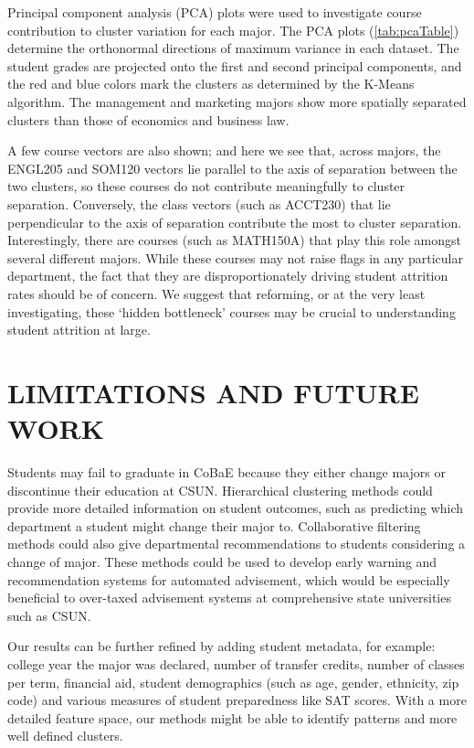 \documentclass{sigchi}
\begin{document}
Principal component analysis (PCA) plots were used to investigate course contribution to cluster variation for each major. The PCA plots (\ref{tab:pcaTable}) determine the orthonormal directions of maximum variance in each dataset. The student grades are projected onto the first and second principal components, and the red and blue colors mark the clusters as determined by the K-Means algorithm. The management and marketing majors show more spatially separated clusters than those of economics and business law. 

A few course vectors are also shown; and here we see that, across majors, the ENGL205 and SOM120 vectors lie parallel  to the axis of separation between the two clusters, so these courses do not contribute meaningfully to cluster separation. Conversely, the class vectors (such as ACCT230) that lie perpendicular to the axis of separation contribute the most to cluster separation. Interestingly, there are courses (such as MATH150A) that play this role amongst several different majors. While these courses may not raise flags in any particular department, the fact that they are disproportionately driving student attrition rates should be of concern. We suggest that reforming, or at the very least investigating, these ‘hidden bottleneck’ courses may be crucial to understanding student attrition at large.




\section{LIMITATIONS AND FUTURE WORK}


Students may fail to graduate in CoBaE because they either change majors or discontinue their education at CSUN.  Hierarchical clustering methods could provide more detailed information on student outcomes, such as predicting which department a student might change their major to. Collaborative filtering methods could also give departmental recommendations to students considering a change of major. These methods could be used to develop early warning and recommendation systems for automated advisement, which would be especially beneficial to over-taxed advisement systems at comprehensive state universities such as CSUN.

Our results can be further refined by adding student metadata, for example: college year the major was declared, number of transfer credits, number of classes per term, financial aid, student demographics (such as age, gender, ethnicity, zip code) and various measures of student preparedness like SAT scores. With a more detailed feature space, our methods might be able to identify patterns and more well defined clusters. 
\end{document}
